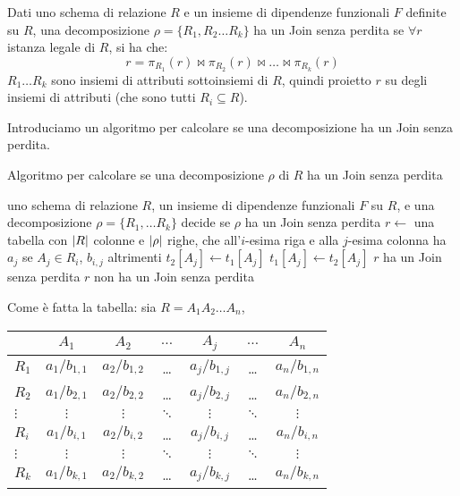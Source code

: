 \begin{defn}
Dati uno schema di relazione $R$ e un insieme di dipendenze funzionali $F$ definite su $R$, una decomposizione $\rho = \{ R_1, R_2 \dots R_k \}$ ha un Join senza perdita se $\forall r$ istanza legale di $R$, si ha che:
\[
r = \pi_{R_1} (r) \Join \pi_{R_2} (r) \Join \dots \Join \pi_{R_k} (r)
\]
$R_1 \dots R_k$ sono insiemi di attributi sottoinsiemi di $R$, quindi proietto $r$ su degli insiemi di attributi (che sono tutti $R_i \subseteq R$).
\end{defn}

Introduciamo un algoritmo per calcolare se una decomposizione ha un Join senza perdita.

\begin{algorithm}
\caption{Algoritmo per calcolare se una decomposizione $\rho$ di $R$ ha un Join senza perdita \label{algoritmo_decomposizione_join_senza_perdita}}
\begin{algorithmic}
\Require uno schema di relazione $R$, un insieme di dipendenze funzionali $F$ su $R$, e una decomposizione $\rho = \{R_1, \dots R_k\}$
\Ensure decide se $\rho$ ha un Join senza perdita
\State $r \gets$ una tabella con $\left\lvert{R}\right\rvert$ colonne e $\left\lvert{\rho}\right\rvert$ righe, che all'$i$-esima riga e alla $j$-esima colonna ha $a_j$ se $A_j \in R_i$, $b_{i,j}$ altrimenti
\Repeat
                    \State $t_2[A_j] \gets t_1[A_j]$
                \Else
                    \State $t_1[A_j] \gets t_2[A_j]$
                \EndIf
            \EndFor
        \EndFor
    \EndFor
{}
    \State \Return $r$ ha un Join senza perdita
\Else
    \State \Return $r$ non ha un Join senza perdita
\EndIf
\end{algorithmic}
\end{algorithm}

Come \`e fatta la tabella: sia $R = A_1 A_2 \dots A_n$,

\begin{center}
\begin{tabular}{l | *{6}{c}}
& $A_1$ & $A_2$ & $\dots$ & $A_j$ & $\dots$ & $A_n$ \\
\hline
$R_1$ & $a_{1} / b_{1,1}$ & $a_{2} / b_{1,2}$ & \dots & $a_{j} / b_{1,j}$ & \dots & $a_{n} / b_{1,n}$ \\
$R_2$ & $a_{1} / b_{2,1}$ & $a_{2} / b_{2,2}$ & \dots & $a_{j} / b_{2,j}$ & \dots & $a_{n} / b_{2,n}$ \\
$\vdots$ & $\vdots$ & $\vdots$ & $\ddots$ & $\vdots$ & $\ddots$ & $\vdots$ \\
$R_i$ & $a_{1} / b_{i,1}$ & $a_{2} / b_{i,2}$ & \dots & $a_{j} / b_{i,j}$ & \dots & $a_{n} / b_{i,n}$ \\
$\vdots$ & $\vdots$ & $\vdots$ & $\ddots$ & $\vdots$ & $\ddots$ & $\vdots$ \\
$R_k$ & $a_{1} / b_{k,1}$ & $a_{2} / b_{k,2}$ & \dots & $a_{j} / b_{k,j}$ & \dots & $a_{n} / b_{k,n}$
\end{tabular}
\end{center}

